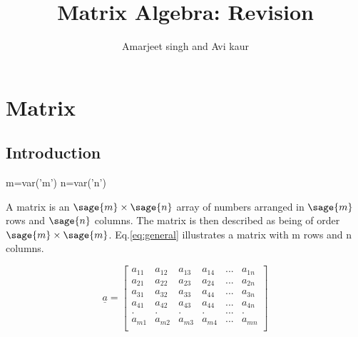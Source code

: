 \documentclass[12pt]{report}
\title{Matrix Algebra: Revision}
\author{Amarjeet singh and Avi kaur}
\newcommand{\lab}[1]{
	Eq.\ref{#1}
}
\begin{document}
	\begin{titlepage}
\maketitle
	\end{titlepage}
	\chapter{Matrix}
	\section{Introduction}
	\begin{sagesilent}
		m=var('m')
		n=var('n')
	\end{sagesilent}

A matrix is an $\sage{m} \times \sage{n}$ 
array of numbers arranged in $\sage{m}$ rows and $\sage{n}$ columns.
The matrix is then described as being of order 
$\sage{m} \times \sage{m}$. \lab{eq:general} illustrates a matrix with m rows and n columns.


\begin{equation}
	\underline{a}=\left[\begin{array}{rrrrrr}
		a_{11} & a_{12} & a_{13} & a_{14} & ... & a_{1n} \\
		a_{21} & a_{22} & a_{23} & a_{24} & ... & a_{2n} \\
		a_{31} & a_{32} & a_{33} & a_{44} & ... & a_{3n} \\
		a_{41} & a_{42} & a_{43} & a_{44} & ... & a_{4n} \\
		.     & .     & .     & .     & ... & .     \\
		a_{m1} & a_{m2} & a_{m3} & a_{m4} & ... & a_{mn} \\
	\end{array}\right] \label{eq:general}          
\end{equation}
\end{document}
